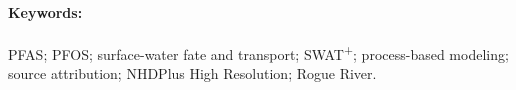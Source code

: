 \paragraph{Keywords:} PFAS; PFOS; surface-water fate and transport; SWAT\textsuperscript{+}; process-based modeling; source attribution; NHDPlus High Resolution; Rogue River.
